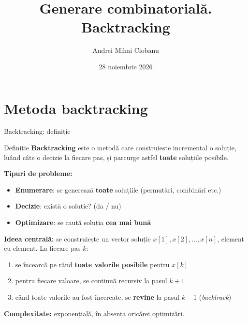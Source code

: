 \documentclass[8pt,mathserif]{beamer}
\title[Generare combinatorială. Backtracking]{Generare combinatorială.\\Backtracking}
\author[A. M. Ciobanu]{Andrei Mihai Ciobanu}
\institute[Infogym]{Infogym \textbullet{} grupa 7--8}
\date[28.11.2026]{28 noiembrie 2026}
\begin{document}
\igtitleslide

\section{Metoda backtracking}

\begin{frame}{Backtracking: definiție}
  \begin{block}{Definiție}
    \textbf{Backtracking} este o metodă care construiește incremental o soluție, luând câte o decizie la fiecare pas, și parcurge astfel \textbf{toate} soluțiile posibile.
  \end{block}
  \smallskip
  \textbf{Tipuri de probleme:}
  \begin{itemize}
    \item \textbf{Enumerare}: se generează \textbf{toate} soluțiile (permutări, combinări etc.)
    \item \textbf{Decizie}: există o soluție? (da / nu)
    \item \textbf{Optimizare}: se caută soluția \textbf{cea mai bună}
  \end{itemize}
  \smallskip
  \textbf{Ideea centrală:} se construiește un vector soluție $x[1], x[2], \ldots, x[n]$, element cu element. La fiecare pas $k$:
  \begin{enumerate}
    \item se încearcă pe rând \textbf{toate valorile posibile} pentru $x[k]$
    \item pentru fiecare valoare, se continuă recursiv la pasul $k+1$
    \item când toate valorile au fost încercate, se \textbf{revine} la pasul $k-1$ (\textit{backtrack})
  \end{enumerate}
  \smallskip
  \textbf{Complexitate:} exponențială, în absența oricărei optimizări.
\end{frame}
\end{document}
